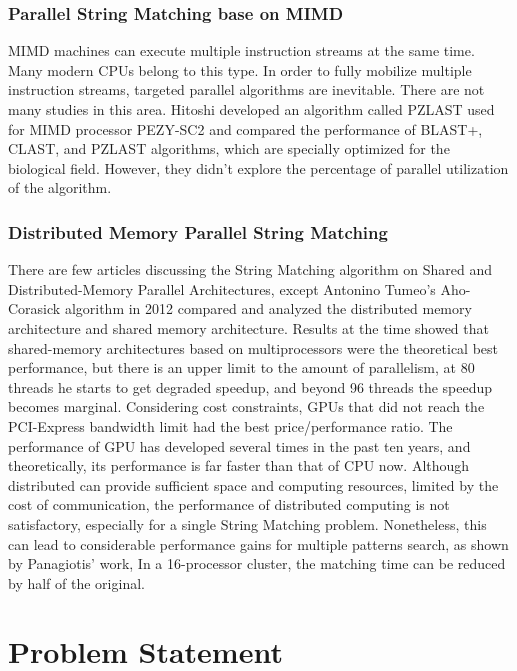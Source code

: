 \documentclass[11pt]{article}       %
\begin{document}
\subsubsection{Parallel String Matching base on MIMD}
MIMD machines can execute multiple instruction streams at the same time. Many modern CPUs belong to this type. In order to fully mobilize multiple instruction streams, targeted parallel algorithms are inevitable. There are not many studies in this area. Hitoshi developed an algorithm called PZLAST used for MIMD processor PEZY-SC2 and compared the performance of BLAST+, CLAST, and PZLAST algorithms\cite{MIMD}, which are specially optimized for the biological field. However, they didn't explore the percentage of parallel utilization of the algorithm.


\subsubsection{Distributed Memory Parallel String Matching}
There are few articles discussing the String Matching algorithm on Shared and Distributed-Memory Parallel Architectures, except Antonino Tumeo's Aho-Corasick algorithm in 2012 compared and analyzed the distributed memory architecture and shared memory architecture\cite{Distributed-Memory}. Results at the time showed that shared-memory architectures based on multiprocessors were the theoretical best performance, but there is an upper limit to the amount of parallelism, at 80 threads he starts to get degraded speedup, and beyond 96 threads the speedup becomes marginal. Considering cost constraints, GPUs that did not reach the PCI-Express bandwidth limit had the best price/performance ratio. The performance of GPU has developed several times in the past ten years, and theoretically, its performance is far faster than that of CPU now. Although distributed can provide sufficient space and computing resources, limited by the cost of communication, the performance of distributed computing is not satisfactory, especially for a single String Matching problem. Nonetheless, this can lead to considerable performance gains for multiple patterns search, as shown by Panagiotis' work\cite{MPI}, In a 16-processor cluster, the matching time can be reduced by half of the original.


\section{Problem Statement} \label{problemStatement}
\end{document}
